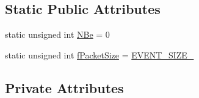 \subsection*{Static Public Attributes}
\begin{DoxyCompactItemize}
\item 
static unsigned int \hyperlink{class_ph2___hw_interface_1_1_g_l_i_b_interface_a85f9c804b41b8eb7b4d81f7307b5bc4a}{N\-Be} = 0
\item 
static unsigned int \hyperlink{class_ph2___hw_interface_1_1_g_l_i_b_interface_a7e34fbc5d0399cb77d070c8062e104f9}{f\-Packet\-Size} = \hyperlink{_g_l_i_b_interface_8cc_a99f68b90851a6e4f890bd520f4ae5a8f}{E\-V\-E\-N\-T\-\_\-\-S\-I\-Z\-E\-\_}
\end{DoxyCompactItemize}
\subsection*{Private Attributes}
